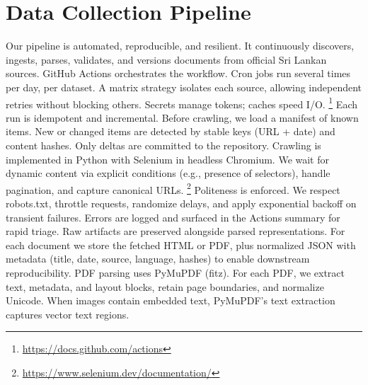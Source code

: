 \documentclass[10pt,a4paper]{article}%
\begin{document}
\section{Data Collection Pipeline}%
\label{sec:DataCollectionPipeline}%
Our pipeline is automated, reproducible, and resilient. It continuously discovers, ingests, parses, validates, and versions documents from official Sri Lankan sources.%
\citep{MLOpsSurvey2022}%
\newline%
\newline%
GitHub Actions orchestrates the workflow. Cron jobs run several times per day, per dataset. A matrix strategy isolates each source, allowing independent retries without blocking others. Secrets manage tokens; caches speed I/O.%
\footnote{\href{https://docs.github.com/actions}{https://docs.github.com/actions}}%
\newline%
\newline%
Each run is idempotent and incremental. Before crawling, we load a manifest of known items. New or changed items are detected by stable keys (URL + date) and content hashes. Only deltas are committed to the repository.%
\citep{ReproducibleResearch2017}%
\newline%
\newline%
Crawling is implemented in Python with Selenium in headless Chromium. We wait for dynamic content via explicit conditions (e.g., presence of selectors), handle pagination, and capture canonical URLs.%
\footnote{\href{https://www.selenium.dev/documentation/}{https://www.selenium.dev/documentation/}}%
\newline%
\newline%
Politeness is enforced. We respect robots.txt, throttle requests, randomize delays, and apply exponential backoff on transient failures. Errors are logged and surfaced in the Actions summary for rapid triage.%
\citep{WebCrawlingBestPractices2021}%
\newline%
\newline%
Raw artifacts are preserved alongside parsed representations. For each document we store the fetched HTML or PDF, plus normalized JSON with metadata (title, date, source, language, hashes) to enable downstream reproducibility.%
\citep{DataVersioning2020}%
\newline%
\newline%
PDF parsing uses PyMuPDF (fitz). For each PDF, we extract text, metadata, and layout blocks, retain page boundaries, and normalize Unicode. When images contain embedded text, PyMuPDF’s text extraction captures vector text regions.%
\end{document}
